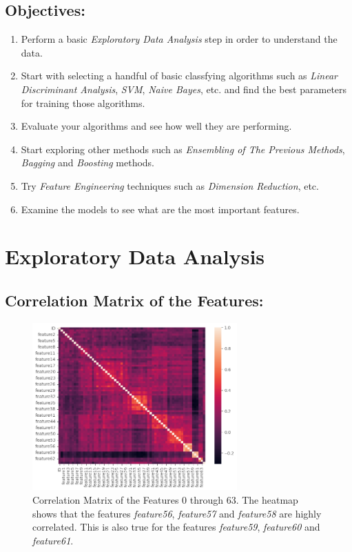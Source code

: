 \documentclass[a4paper,12pt]{article}
\begin{document}
\subsection{Objectives:} 
\begin{enumerate}
    \item Perform a basic \textit{Exploratory Data Analysis} step in order to understand the data.
    \item Start with selecting a handful of basic classfying algorithms such as \textit{Linear Discriminant Analysis}, \textit{SVM}, \textit{Naive Bayes}, etc. and find the best parameters for training those algorithms. 
    \item Evaluate your algorithms and see how well they are performing.
    \item Start exploring other methods such as \textit{Ensembling of The Previous Methods}, \textit{Bagging} and \textit{Boosting} methods.
    \item Try \textit{Feature Engineering} techniques such as \textit{Dimension Reduction}, etc.
    \item Examine the models to see what are the most important features.
\end{enumerate}


\section{Exploratory Data Analysis}
\subsection{Correlation Matrix of the Features:}
\begin{figure}[H]
    \centering
    \includegraphics[width=0.7\textwidth]{./images/corr_mat.png}
    \caption{Correlation Matrix of the Features 0 through 63. The heatmap shows that the features \textit{feature56}, \textit{feature57} and \textit{feature58} are highly correlated. 
    This is also true for the features \textit{feature59}, \textit{feature60} and \textit{feature61}.}
    \label{fig:fig_1}
\end{figure}
\end{document}
